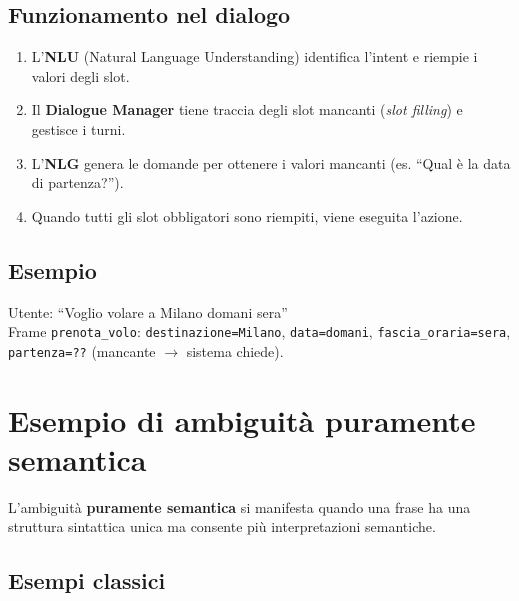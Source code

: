 \documentclass[12pt,a4paper]{article}
\begin{document}
\subsection{Funzionamento nel dialogo}
\begin{enumerate}[leftmargin=1.5em, label=\arabic*.]
  \item L'\textbf{NLU} (Natural Language Understanding) identifica l'intent e riempie i valori degli slot.
  \item Il \textbf{Dialogue Manager} tiene traccia degli slot mancanti (\emph{slot filling}) e gestisce i turni.
  \item L'\textbf{NLG} genera le domande per ottenere i valori mancanti (es. ``Qual è la data di partenza?'').
  \item Quando tutti gli slot obbligatori sono riempiti, viene eseguita l'azione.
\end{enumerate}

\subsection{Esempio}
Utente: ``Voglio volare a Milano domani sera''\\
Frame \texttt{prenota\_volo}: \texttt{destinazione=Milano}, \texttt{data=domani}, \texttt{fascia\_oraria=sera}, \texttt{partenza=??} (mancante $\to$ sistema chiede).

\section{Esempio di ambiguità puramente semantica}

L'ambiguità \textbf{puramente semantica} si manifesta quando una frase ha una struttura sintattica unica ma consente più interpretazioni semantiche.

\subsection{Esempi classici}
\end{document}
